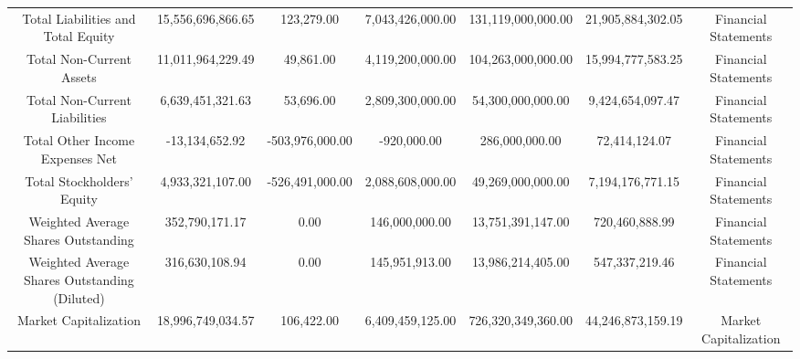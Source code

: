 \begin{longtable}{ccccccc}
Total Liabilities and Total Equity & 15,556,696,866.65 & 123,279.00 & 7,043,426,000.00 & 131,119,000,000.00 & 21,905,884,302.05 & Financial Statements \\
Total Non-Current Assets & 11,011,964,229.49 & 49,861.00 & 4,119,200,000.00 & 104,263,000,000.00 & 15,994,777,583.25 & Financial Statements \\
Total Non-Current Liabilities & 6,639,451,321.63 & 53,696.00 & 2,809,300,000.00 & 54,300,000,000.00 & 9,424,654,097.47 & Financial Statements \\
Total Other Income Expenses Net & -13,134,652.92 & -503,976,000.00 & -920,000.00 & 286,000,000.00 & 72,414,124.07 & Financial Statements \\
Total Stockholders' Equity & 4,933,321,107.00 & -526,491,000.00 & 2,088,608,000.00 & 49,269,000,000.00 & 7,194,176,771.15 & Financial Statements \\
Weighted Average Shares Outstanding & 352,790,171.17 & 0.00 & 146,000,000.00 & 13,751,391,147.00 & 720,460,888.99 & Financial Statements \\
Weighted Average Shares Outstanding (Diluted) & 316,630,108.94 & 0.00 & 145,951,913.00 & 13,986,214,405.00 & 547,337,219.46 & Financial Statements \\
Market Capitalization & 18,996,749,034.57 & 106,422.00 & 6,409,459,125.00 & 726,320,349,360.00 & 44,246,873,159.19 & Market Capitalization \\
\end{longtable}

\normalsize